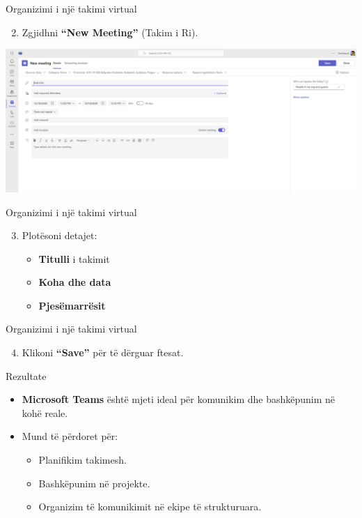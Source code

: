 \documentclass[
  ignorenonframetext,
]{beamer}
\providecommand{\tightlist}{%
  \setlength{\itemsep}{0pt}\setlength{\parskip}{0pt}}
\begin{document}
\begin{frame}{Organizimi i një takimi virtual}
\label{organizimi-i-njuxeb-takimi-virtual-1}
\begin{enumerate}
\setcounter{enumi}{1}
\tightlist
\item
  Zgjidhni \textbf{``New Meeting''} (Takim i Ri).
\end{enumerate}

\includegraphics{./images/teams5.png}
\end{frame}

\begin{frame}{Organizimi i një takimi virtual}
\label{organizimi-i-njuxeb-takimi-virtual-2}
\begin{enumerate}
\setcounter{enumi}{2}
\item
  Plotësoni detajet:

  \begin{itemize}
  \item
    \textbf{Titulli} i takimit
  \item
    \textbf{Koha dhe data}
  \item
    \textbf{Pjesëmarrësit}
  \end{itemize}
\end{enumerate}
\end{frame}

\begin{frame}{Organizimi i një takimi virtual}
\label{organizimi-i-njuxeb-takimi-virtual-3}
\begin{enumerate}
\setcounter{enumi}{3}
\tightlist
\item
  Klikoni \textbf{``Save''} për të dërguar ftesat.
\end{enumerate}
\end{frame}

\begin{frame}{Rezultate}
\label{rezultate-5}
\begin{itemize}
\item
  \textbf{Microsoft Teams} është mjeti ideal për komunikim dhe
  bashkëpunim në kohë reale.
\item
  Mund të përdoret për:

  \begin{itemize}
  \item
    Planifikim takimesh.
  \item
    Bashkëpunim në projekte.
  \item
    Organizim të komunikimit në ekipe të strukturuara.
  \end{itemize}
\end{itemize}
\end{frame}
\end{document}
